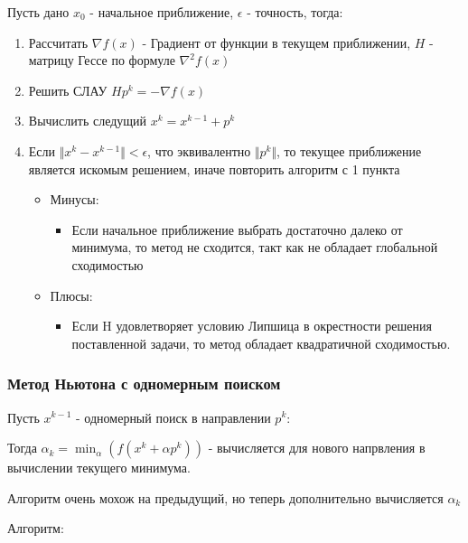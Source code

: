 \documentclass[a4paper, 14pt]{article}
\begin{document}
	Пусть дано $x_0$ - начальное приближение, $\epsilon$ - точность, тогда:
	\begin{enumerate}
		\item Рассчитать $\nabla f(x)$ - Градиент от функции в текущем приближении, $H$ - матрицу Гессе по формуле $\nabla^2 f(x)$
		\item Решить СЛАУ $Hp^k = - \nabla f(x)$
		\item Вычислить следущий $x^k = x^{k-1} + p^k$
		\item Если $\Vert x^k - x^{k-1} \Vert < \epsilon$, что эквивалентно $\Vert p^k \Vert$, то текущее приближение является искомым решением, иначе повторить алгоритм с 1 пункта
		\begin{itemize}
		\item Минусы:
		\begin{itemize}
			\item Если начальное приближение выбрать достаточно далеко от минимума, то метод не сходится, такт как не обладает глобальной сходимостью
		\end{itemize}
		\item Плюсы:
		\begin{itemize}
			\item Если H удовлетворяет условию Липшица в окрестности решения поставленной задачи, то метод обладает квадратичной сходимостью.
		\end{itemize}
		
\end{itemize}		  
	\end{enumerate}
	
	
	\subsubsection*{Метод Ньютона с одномерным поиском}
	
	Пусть $x^{k-1}$ - одномерный поиск в направлении $p^k$:
	
	Тогда $\alpha_k = \min_\alpha(f(x^k + \alpha p^k)) $ - вычисляется для нового напрвления в вычислении текущего минимума.
	
	Алгоритм очень мохож на предыдущий, но теперь дополнительно вычисляется  $\alpha_k$
	
		 Алгоритм:
		 
\end{document}
